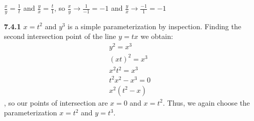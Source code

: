 \documentclass[10pt]{article}
\begin{document}
\begin{enumerate}
    $\frac{x}{y}=\frac{1}{t}$ and $\frac{y}{x}=\frac{t}{1}$, so $\frac{x}{y}\rightarrow\frac{1}{-1}=-1$ and $\frac{y}{x}\rightarrow\frac{-1}{1}=-1$
    \item [\textbf{7.4.1}] $x=t^2$ and $y^3$ is a simple parameterization by inspection. Finding the second intersection point of the line $y=tx$ we obtain:
    \begin{align*}
        &y^2=x^3\\
        &{(xt)}^2=x^3\\
        &x^2t^2=x^3\\
        &t^2x^2-x^3=0\\
        &x^2(t^2-x)
    \end{align*}
    , so our points of intersection are $x=0$ and $x=t^2$. Thus, we again choose the parameterization $x=t^2$ and $y=t^3$.
\end{enumerate}
\end{document}
